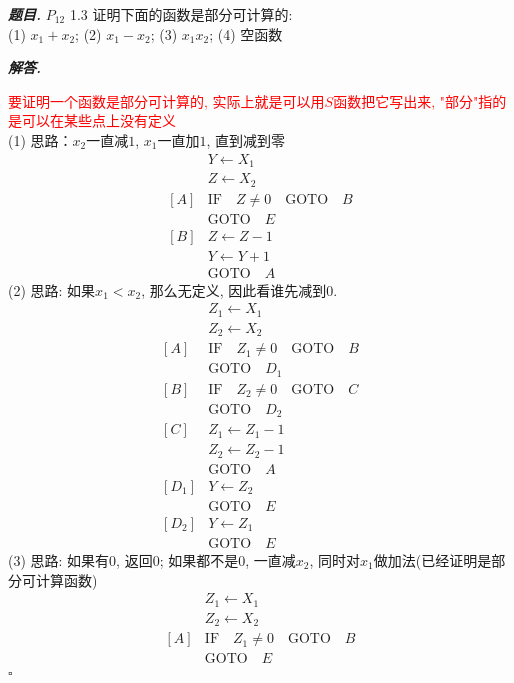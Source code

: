 \documentclass[10pt, a4paper, oneside]{ctexart}
\newenvironment{problem}{\begin{framed}\par\noindent\textbf{\textit{题目. }}}{\end{framed}\par}
\newenvironment{solution}{%
  \par\noindent\textbf{\textit{解答. }}\ignorespaces
}{%
  \hfill\ensuremath{\square}\par
}
\begin{document}
\begin{problem}
$P_{12}$ 1.3 证明下面的函数是部分可计算的:\\
(1) $x_1+x_2$;  (2) $x_1-x_2$;  (3) $x_1x_2$;  (4) 空函数
\end{problem}
\begin{solution}
\textcolor{red}{要证明一个函数是部分可计算的, 实际上就是可以用$S$函数把它写出来, "部分"指的是可以在某些点上没有定义}\\
(1) 思路：$x_2$一直减$1$, $x_1$一直加$1$, 直到减到零
\begin{align*}
    &Y\leftarrow X_1\\
    &Z\leftarrow X_2\\
    [A]& \text{IF} \quad Z\neq 0 \quad \text{GOTO} \quad B\\
    & \text{GOTO}\quad E\\
    [B]& Z\leftarrow Z-1\\
    &Y\leftarrow Y+1\\
    &\text{GOTO}\quad  A
\end{align*} 
(2) 思路: 如果$x_1<x_2$, 那么无定义, 因此看谁先减到$0$.
\begin{align*}
    &Z_1\leftarrow X_1\\
    &Z_2\leftarrow X_2\\
    [A]& \text{IF} \quad Z_1\neq 0 \quad \text{GOTO} \quad B\\
    &\text{GOTO}\quad  D_1\\
    [B]& \text{IF} \quad Z_2\neq 0 \quad \text{GOTO} \quad C\\
    &\text{GOTO}\quad  D_2\\
    [C]& Z_1\leftarrow Z_1-1\\
    & Z_2\leftarrow Z_2-1\\
    &\text{GOTO}\quad  A\\
    [D_1]& Y\leftarrow Z_2\\
    &\text{GOTO}\quad  E\\
    [D_2]& Y\leftarrow Z_1\\
    &\text{GOTO}\quad  E
\end{align*}
(3) 思路: 如果有$0$, 返回$0$; 如果都不是$0$, 一直减$x_2$, 同时对$x_1$做加法(已经证明是部分可计算函数)
\begin{align*}
    &Z_1\leftarrow X_1\\
    &Z_2\leftarrow X_2\\
    [A]& \text{IF} \quad Z_1\neq 0 \quad \text{GOTO} \quad B\\
    &\text{GOTO}\quad  E\\

\end{align*}
\end{solution}
\end{document}
